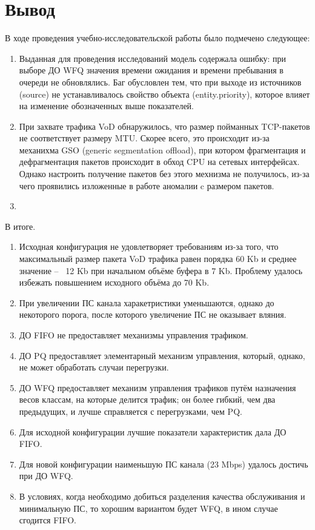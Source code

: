 \documentclass[12pt, a4paper] {ncc}
\begin{document}
\section*{Вывод}

В ходе проведения учебно-исследовательской работы было подмечено следующее:
\begin{enumerate}
	\item Выданная для проведения исследований модель содержала ошибку: при выборе ДО WFQ значения времени ожидания
		  и времени пребывания в очереди не обновлялись. Баг обусловлен тем, что при выходе из источников (source)
		  не устанавливалось свойство объекта (entity.priority), которое влияет на изменение обозначенных выше показателей.
	\item При захвате трафика VoD обнаружилось, что размер пойманных TCP-пакетов не соответствует размеру MTU. Скорее всего,
		  это происходит из-за механихма GSO (generic segmentation offload), при котором фрагментация и дефрагментация пакетов
		  происходит в обход CPU на сетевых интерфейсах. Однако настроить получение пакетов без этого мехнизма не получилось,
		  из-за чего проявились изложенные в работе аномалии c размером пакетов.  
	\item 
\end{enumerate}
В итоге.
\begin{enumerate}
	\item Исходная конфигурация не удовлетворяет требованиям из-за того, что максимальный размер пакета VoD трафика равен
		  порядка 60 Kb и среднее значение -- ~12 Kb при начальном объёме буфера в 7 Kb. Проблему удалось избежать повышением
		  исходного объёма до 70 Kb. 
	\item При увеличении ПС канала харакетристики уменьшаются, однако до некоторого порога, после которого увеличение ПС
		  не оказывает вляния.
	\item ДО FIFO не предоставляет механизмы управления трафиком.
	\item ДО PQ предоставляет элементарный механизм управления, который, однако, не может обработать случаи перегрузки.
	\item ДО WFQ предоставляет механизм управления трафиков путём назначения весов классам, на которые делится трафик; он более
		  гибкий, чем два предыдущих, и лучше справляется с перегрузками, чем PQ.
	\item Для исходной конфигурации лучшие показатели характеристик дала ДО FIFO.
	\item Для новой конфигурации наименьшую ПС канала (23 Mbps) удалось достичь при ДО WFQ.
	\item В условиях, когда необходимо добиться разделения качества обслуживания и минимальную ПС, то хорошим вариантом будет WFQ,
		  в ином случае сгодится FIFO. 
\end{enumerate}
\end{document}
